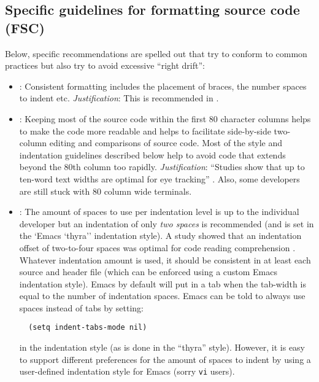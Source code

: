 %
\subsection{Specific guidelines for formatting source code (FSC)}
%

Below, specific recommendations are spelled out that try to conform to common
practices but also try to avoid excessive ``right drift'':


\begin{itemize}


{}\item\FSCConsistentInFile: Consistent formatting includes the placement of
braces, the number spaces to indent etc.  {}\textit{Justification}: This is
recommended in {}\cite[Item 0]{C++CodingStandards05}.


{}\item\FSCEightyCharWide: Keeping most of the source code within the first 80
character columns helps to make the code more readable and helps to facilitate
side-by-side two-column editing and comparisons of source code.  Most of the
style and indentation guidelines described below help to avoid code that
extends beyond the 80th column too rapidly. {}\textit{Justification}:
``Studies show that up to ten-word text widths are optimal for eye tracking''
{}\cite[Item 0]{C++CodingStandards05}.  Also, some developers are still stuck
with 80 column wide terminals.


{}\item\FSCIndentSpaces: The amount of spaces to use per indentation level is
up to the individual developer but an indentation of only {}\textit{two
spaces} is recommended (and is set in the `Emacs `thyra'' indentation style).
A study showed that an indentation offset of two-to-four spaces was optimal
for code reading comprehension {}\cite[Section 31.2]{CodeComplete2nd04}.
Whatever indentation amount is used, it should be consistent in at least each
source and header file {}\cite[Item 0]{C++CodingStandards05} (which can be
enforced using a custom Emacs indentation style).  Emacs by default will put
in a tab when the tab-width is equal to the number of indentation spaces.
Emacs can be told to always use spaces instead of tabs by setting:

{\small\begin{verbatim}
  (setq indent-tabs-mode nil)
\end{verbatim}}

in the indentation style (as is done in the ``thyra'' style).  However, it is
easy to support different preferences for the amount of spaces to indent by
using a user-defined indentation style for Emacs (sorry {}\texttt{vi} users).


\end{itemize}
